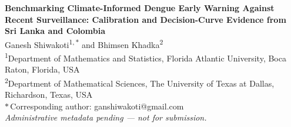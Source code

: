 \documentclass[11pt,a4paper]{article}
\begin{document}
\begin{center}
{\Large \textbf{Benchmarking Climate-Informed Dengue Early Warning Against Recent Surveillance: Calibration and Decision-Curve Evidence from Sri Lanka and Colombia}}\\[1.2em]

Ganesh Shiwakoti\textsuperscript{1,\,$\ast$} and Bhimsen Khadka\textsuperscript{2}\\[0.6em]

\footnotesize
\textsuperscript{1}Department of Mathematics and Statistics, Florida Atlantic University, Boca Raton, Florida, USA\\
\textsuperscript{2}Department of Mathematical Sciences, The University of Texas at Dallas, Richardson, Texas, USA\\[0.3em]
$\ast$\,Corresponding author: ganshiwakoti@gmail.com\\[0.7em]
\textit{Administrative metadata pending --- not for submission.}
\end{center}

\vspace{0.5em}
\end{document}
